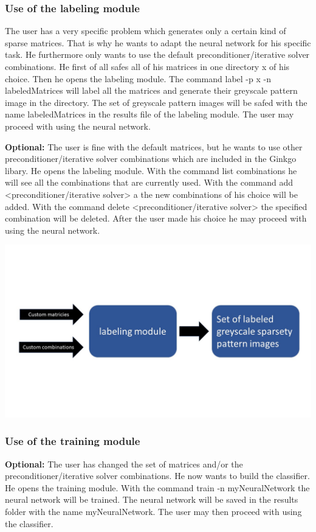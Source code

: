 \documentclass[parskip=full]{scrartcl}
\begin{document}
\subsubsection{Use of the \gls{labeling module}}
The user has a very specific problem which generates only a certain kind of sparse matrices. That is why he wants to adapt the \gls{neural network} for his specific task. He furthermore only wants to use the default \gls{preconditioner}/\gls{iterative solver} combinations. He first of all safes all of his matrices in one directory x of his choice. Then he opens the \gls{labeling module}. The command label -p x -n labeledMatrices will label all the matrices and generate their greyscale pattern image in the directory. The set of greyscale pattern images will be safed with the name labeledMatrices in the results file of the \gls{labeling module}. The user may proceed with using the \gls{neural network}.


\textbf{Optional:} The user is fine with the default matrices, but he wants to use other \gls{preconditioner}/\gls{iterative solver} combinations which are included in the \gls{Ginkgo} libary. He opens the \gls{labeling module}. With the command list combinations he will see all the combinations that are currently used. With the command add <\gls{preconditioner}/\gls{iterative solver}> a the new combinations of his choice will be added. With the command delete <\gls{preconditioner}/\gls{iterative solver}> the specified combination will be deleted. After the user made his choice he may proceed with using the \gls{neural network}.
\begin{center}
\includegraphics[width=\textwidth]{labelingModule}
\end{center}


\subsubsection{Use of the \gls{training module}}
\textbf{Optional:} The user has changed the set of matrices and/or the \gls{preconditioner}/\gls{iterative solver} combinations. He now wants to build the \gls{classifier}. He opens the \gls{training module}. With the command train -n myNeuralNetwork the \gls{neural network} will be trained. The \gls{neural network} will be saved in the results folder with the name myNeuralNetwork.  The user may then proceed with using the \gls{classifier}.
\end{document}

